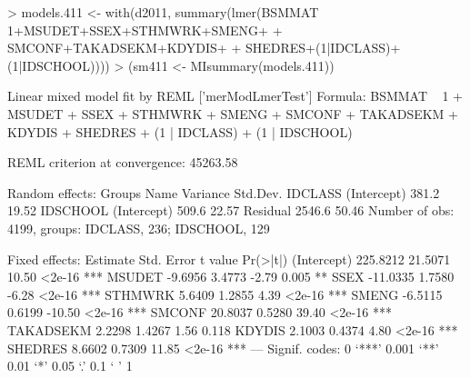 \documentclass[a4paper]{article}
\begin{document}
\begin{Schunk}
\begin{Sinput}
> models.411 <- with(d2011, summary(lmer(BSMMAT ~ 1+MSUDET+SSEX+STHMWRK+SMENG+
+                                         SMCONF+TAKADSEKM+KDYDIS+
+                                         SHEDRES+(1|IDCLASS)+(1|IDSCHOOL))))
> (sm411 <- MIsummary(models.411))
\end{Sinput}
\begin{Soutput}
Linear mixed model fit by REML ['merModLmerTest']
Formula: BSMMAT ~ 1 + MSUDET + SSEX + STHMWRK + SMENG + SMCONF + TAKADSEKM +      KDYDIS + SHEDRES + (1 | IDCLASS) + (1 | IDSCHOOL) 

REML criterion at convergence: 45263.58 

Random effects:
 Groups   Name        Variance Std.Dev.
 IDCLASS  (Intercept)  381.2   19.52   
 IDSCHOOL (Intercept)  509.6   22.57   
 Residual             2546.6   50.46   
Number of obs: 4199, groups: IDCLASS, 236; IDSCHOOL, 129

Fixed effects:
            Estimate Std. Error t value Pr(>|t|)    
(Intercept) 225.8212    21.5071   10.50   <2e-16 ***
MSUDET       -9.6956     3.4773   -2.79    0.005 ** 
SSEX        -11.0335     1.7580   -6.28   <2e-16 ***
STHMWRK       5.6409     1.2855    4.39   <2e-16 ***
SMENG        -6.5115     0.6199  -10.50   <2e-16 ***
SMCONF       20.8037     0.5280   39.40   <2e-16 ***
TAKADSEKM     2.2298     1.4267    1.56    0.118    
KDYDIS        2.1003     0.4374    4.80   <2e-16 ***
SHEDRES       8.6602     0.7309   11.85   <2e-16 ***
---
Signif. codes:  0 ‘***’ 0.001 ‘**’ 0.01 ‘*’ 0.05 ‘.’ 0.1 ‘ ’ 1


\end{Soutput}
\end{Schunk}
\end{document}
